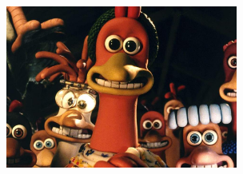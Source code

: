 \documentclass[12pt]{article}
\begin{document}
\begin{center}
\includegraphics[width=3in,height=5in,keepaspectratio]{chicken-run.jpg}
\end{center}
\end{document}
